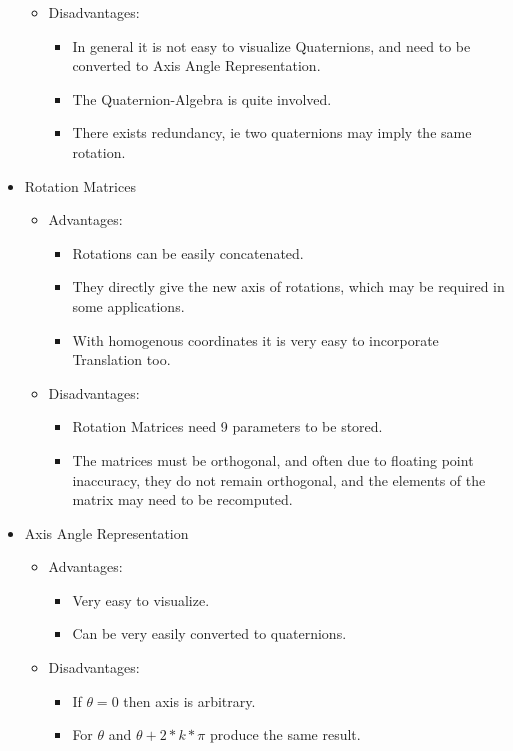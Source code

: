 \documentclass{article}
\begin{document}
\begin{itemize}
\begin{itemize}
  \item Disadvantages:
    \begin{itemize}
    \item In general it is not easy to visualize Quaternions, and need to be converted to Axis Angle Representation.
    \item The Quaternion-Algebra is quite involved.
    \item There exists redundancy, ie two quaternions may imply the same rotation.
    \end{itemize}
  \end{itemize}

\item Rotation Matrices
  \begin{itemize}
  \item Advantages:
    \begin{itemize}
    \item Rotations can be easily concatenated.
    \item They directly give the new axis of rotations, which may be required in some applications.
    \item With homogenous coordinates it is very easy to incorporate Translation too.
    \end{itemize}

  \item Disadvantages:
    \begin{itemize}
    \item Rotation Matrices need 9 parameters to be stored.
    \item The matrices must be orthogonal, and often due to floating point inaccuracy, they do not remain orthogonal, and the elements of the matrix may need to be recomputed.
    \end{itemize}
  \end{itemize}

\item Axis Angle Representation
  \begin{itemize}
  \item Advantages:
    \begin{itemize}
    \item Very easy to visualize.
    \item Can be very easily converted to quaternions.
    \end{itemize}
  \item Disadvantages:
    \begin{itemize}
    \item If $\theta = 0$ then axis is arbitrary.
    \item For $\theta$ and $\theta + 2*k*\pi$ produce the same result.
    \end{itemize}
  \end{itemize}
\end{itemize}
\end{document}
